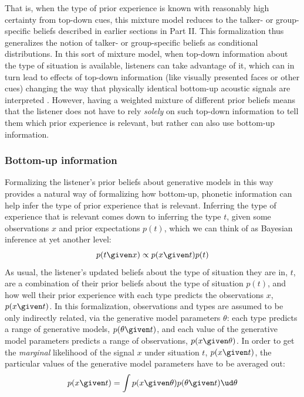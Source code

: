 That is, when the type of prior experience is known with reasonably high certainty from top-down cues, this mixture model reduces to the talker- or group-specific beliefs described in earlier sections in Part II.  This formalization thus generalizes the notion of talker- or group-specific beliefs as conditional distributions.  In this sort of mixture model, when top-down information about the type of situation is available, listeners can take advantage of it, which can in turn lead to effects of top-down information (like visually presented faces or other cues) changing the way that physically identical bottom-up acoustic signals are interpreted \cite{Johnson1999,Hay2010,StaumCasasanto2008,Strand1996}.  However, having a weighted mixture of different prior beliefs means that the listener does not have to rely \emph{solely} on such top-down information to tell them which prior experience is relevant, but rather can also use bottom-up information.

\subsubsection{Bottom-up information}
\label{sec:bott-up-inform}

Formalizing the listener's prior beliefs about generative models in this way provides a natural way of formalizing how bottom-up, phonetic information can help infer the type of prior experience that is relevant.  Inferring the type of experience that is relevant comes down to inferring the type $t$, given some observations $x$ and prior expectations $p(t)$, which we can think of as Bayesian inference at yet another level: 
\begin{equation}
  \label{eq:33}
  p(t \given x) \propto p(x \given t) p(t)
\end{equation}
As usual, the listener's updated beliefs about the type of situation they are in, $t$, are a combination of their prior beliefs about the type of situation $p(t)$, and how well their prior experience with each type predicts the observations $x$, $p(x\given t)$.  In this formalization, observations and types are assumed to be only indirectly related, via the generative model parameters $\theta$: each type predicts a range of generative models, $p(\theta \given t)$, and each value of the generative model parameters predicts a range of observations, $p(x \given \theta)$.  In order to get the \emph{marginal} likelihood of the signal $x$ under situation $t$, $p(x\given t)$, the particular values of the generative model parameters have to be averaged out:
\begin{equation}
  \label{eq:34}
  p(x \given t) = \int p(x \given \theta) p(\theta \given t) \ud \theta
\end{equation}

